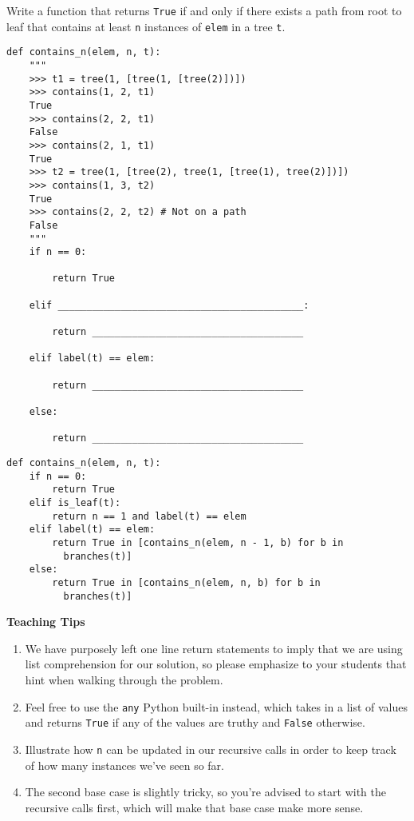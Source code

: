 \begin{blocksection}
\question Write a function that returns \lstinline{True} if and only if there exists a path from root to leaf that contains at least \lstinline{n} instances of \lstinline{elem} in a tree \lstinline{t}.

\begin{lstlisting}
def contains_n(elem, n, t):
    """
    >>> t1 = tree(1, [tree(1, [tree(2)])])
    >>> contains(1, 2, t1)
    True
    >>> contains(2, 2, t1)
    False
    >>> contains(2, 1, t1)
    True
    >>> t2 = tree(1, [tree(2), tree(1, [tree(1), tree(2)])])
    >>> contains(1, 3, t2)
    True
    >>> contains(2, 2, t2) # Not on a path
    False
    """
    if n == 0:

        return True

    elif ___________________________________________:

        return _____________________________________

    elif label(t) == elem:

        return _____________________________________

    else:

        return _____________________________________
\end{lstlisting}
\end{blocksection}

\begin{blocksection}
\begin{solution}
\begin{lstlisting}
def contains_n(elem, n, t):
    if n == 0:
        return True
    elif is_leaf(t):
        return n == 1 and label(t) == elem
    elif label(t) == elem:
        return True in [contains_n(elem, n - 1, b) for b in     
          branches(t)]
    else:
        return True in [contains_n(elem, n, b) for b in 
          branches(t)]
\end{lstlisting}
\end{solution}
\end{blocksection}

\begin{questionmeta}
    \textbf{Teaching Tips}
    \begin{enumerate}
            \item We have purposely left one line return statements to imply that we are using list comprehension for our solution, so please emphasize to your students that hint when walking through the problem.
            \item Feel free to use the \texttt{any} Python built-in instead, which takes in a list of values and returns \texttt{True} if any of the values are truthy and \texttt{False} otherwise.
            \item Illustrate how \texttt{n} can be updated in our recursive calls in order to keep track of how many instances we've seen so far.
            \item The second base case is slightly tricky, so you're advised to start with the recursive calls first, which will make that base case make more sense.
    \end{enumerate}
\end{questionmeta}